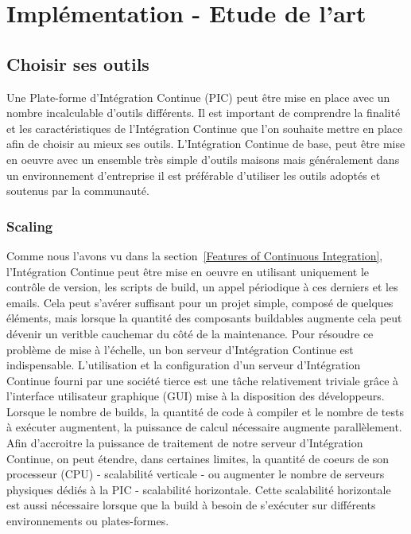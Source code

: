 \chapter{Implémentation - Etude de l'art}

  \section{Choisir ses outils}
  Une Plate-forme d'Intégration Continue (PIC) peut être mise en place avec un nombre incalculable d'outils différents. Il est important de comprendre la finalité et les caractéristiques de l'Intégration Continue que l'on souhaite mettre en place afin de choisir au mieux ses outils. L'Intégration Continue de base, peut être mise en oeuvre avec un ensemble très simple d'outils maisons mais généralement dans un environnement d'entreprise il est préférable d'utiliser les outils adoptés et soutenus par la communauté.

    \subsection{Scaling}
    Comme nous l'avons vu dans la section~\ref{Features of Continuous Integration}, l'Intégration Continue peut être mise en oeuvre en utilisant uniquement le contrôle de version, les scripts de build, un appel périodique à ces derniers et les emails. Cela peut s'avérer suffisant pour un projet simple, composé de quelques éléments, mais lorsque la quantité des composants buildables augmente cela peut dévenir un veritble cauchemar du côté de la maintenance. Pour résoudre ce problème de mise à l'échelle, un bon serveur d'Intégration Continue est indispensable. L'utilisation et la configuration d'un serveur d'Intégration Continue fourni par une société tierce est une tâche relativement triviale grâce à l'interface utilisateur graphique (GUI) mise à la disposition des développeurs.\\

    Lorsque le nombre de builds, la quantité de code à compiler et le nombre de tests à exécuter augmentent, la puissance de calcul nécessaire augmente parallèlement. Afin d'accroitre la puissance de traitement de notre serveur d'Intégration Continue, on peut étendre, dans certaines limites, la quantité de coeurs de son processeur (CPU) - scalabilité verticale - ou augmenter le nombre de serveurs physiques dédiés à la PIC - scalabilité horizontale. Cette scalabilité horizontale est aussi nécessaire lorsque que la build à besoin de s'exécuter sur différents environnements ou plates-formes.

